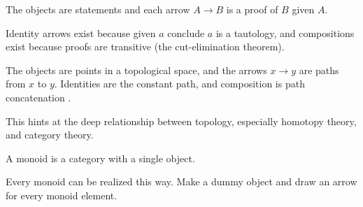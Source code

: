 \documentclass[a5paper]{scrartcl}
\begin{document}
\begin{defn}
  The objects are statements and each arrow \(A\to B\) is a proof of \(B\) given \(A\).

  Identity arrows exist because given \(a\) conclude \(a\) is a tautology, and compositions exist because proofs are transitive (the cut-elimination theorem).
\end{defn}

\begin{defn}
  The objects are points in a topological space, and the arrows \(x\to y\) are paths from \(x\) to \(y\). Identities are the constant path, and composition is path concatenation \cite[201]{groupoid}.
\end{defn}
This hints at the deep relationship between topology, especially homotopy theory, and category theory.


\begin{defn}[Monoid]
A monoid is a category with a single object.
\end{defn}
Every monoid can be realized this way. Make a dummy object and draw an arrow for every monoid element.
\end{document}
